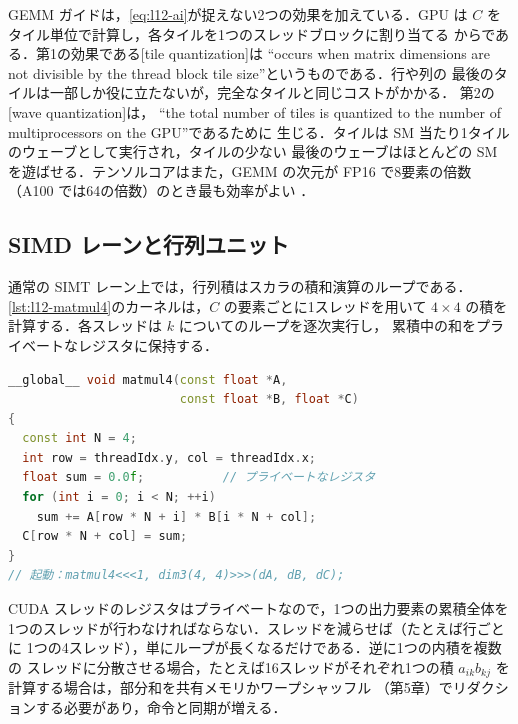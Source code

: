 \documentclass[../main.tex]{subfiles}
\begin{document}
GEMM ガイドは，\cref{eq:l12-ai}が捉えない2つの効果を加えている．GPU は
$C$ をタイル単位で計算し，各タイルを1つのスレッドブロックに割り当てる
からである．第1の効果である[tile quantization]は
\enquote{occurs when matrix dimensions are not divisible by the thread
block tile size}\cite[§3.1]{nvidia2026gemmguide}というものである．行や列の
最後のタイルは一部しか役に立たないが，完全なタイルと同じコストがかかる．
第2の[wave quantization]は，
\enquote{the total number of tiles is quantized to the number of
multiprocessors on the GPU}\cite[§3.2]{nvidia2026gemmguide}であるために
生じる．タイルは SM 当たり1タイルのウェーブとして実行され，タイルの少ない
最後のウェーブはほとんどの SM を遊ばせる．テンソルコアはまた，GEMM の次元が
FP16 で8要素の倍数（A100 では64の倍数）のとき最も効率がよい
\cite[§2.2]{nvidia2026gemmguide}．

\subsection{SIMD レーンと行列ユニット}

通常の SIMT レーン上では，行列積はスカラの積和演算のループである．
\cref{lst:l12-matmul4}のカーネルは，$C$ の要素ごとに1スレッドを用いて
$4 \times 4$ の積を計算する．各スレッドは $k$ についてのループを逐次実行し，
累積中の和をプライベートなレジスタに保持する．

\begin{lstlisting}[language=C++, numbers=none, caption={SIMT レーン上の $4 \times 4$ 行列積．出力要素ごとに1スレッド．}, label={lst:l12-matmul4}]
__global__ void matmul4(const float *A,
                        const float *B, float *C)
{
  const int N = 4;
  int row = threadIdx.y, col = threadIdx.x;
  float sum = 0.0f;           // プライベートなレジスタ
  for (int i = 0; i < N; ++i)
    sum += A[row * N + i] * B[i * N + col];
  C[row * N + col] = sum;
}
// 起動：matmul4<<<1, dim3(4, 4)>>>(dA, dB, dC);
\end{lstlisting}

CUDA スレッドのレジスタはプライベートなので，1つの出力要素の累積全体を
1つのスレッドが行わなければならない．スレッドを減らせば（たとえば行ごとに
1つの4スレッド），単にループが長くなるだけである．逆に1つの内積を複数の
スレッドに分散させる場合，たとえば16スレッドがそれぞれ1つの積
$a_{ik} b_{kj}$ を計算する場合は，部分和を共有メモリかワープシャッフル
（第5章）でリダクションする必要があり，命令と同期が増える．
\end{document}

